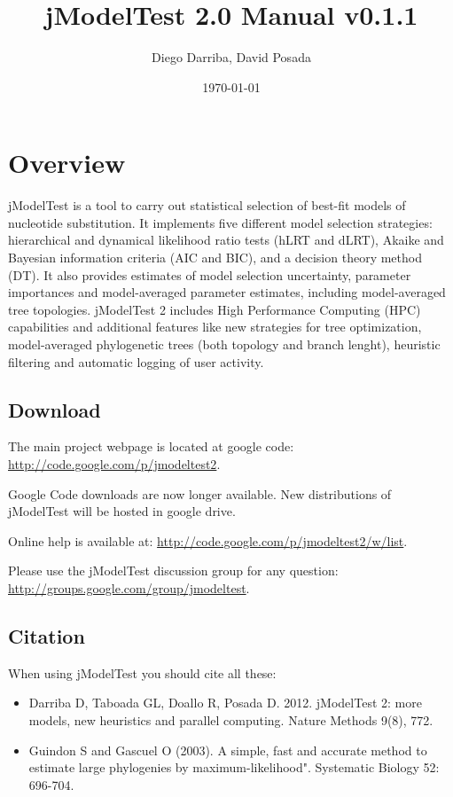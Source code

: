 \documentclass[11pt,twoside,a4paper]{article}
\begin{document}
\providecommand{\versionnumber}{0.1.1}
\title{jModelTest 2.0 Manual v\versionnumber}
\author{Diego Darriba, David Posada}
\date{\today}
\maketitle

\tableofcontents

\section{Overview}

jModelTest is a tool to carry out statistical selection of best-fit models of nucleotide substitution. It implements five different model selection strategies: hierarchical and dynamical likelihood ratio tests (hLRT and dLRT), Akaike and Bayesian information criteria (AIC and BIC), and a decision theory method (DT). It also provides estimates of model selection uncertainty, parameter importances and model-averaged parameter estimates, including model-averaged tree topologies. jModelTest 2 includes High Performance Computing (HPC) capabilities and additional features like new strategies for tree optimization, model-averaged phylogenetic trees (both topology and branch lenght), heuristic filtering and automatic logging of user activity.

\subsection{Download}

The main project webpage is located at google code: \url{http://code.google.com/p/jmodeltest2}.

Google Code downloads are now longer available. New distributions of jModelTest will be hosted in google drive.

Online help is available at: \url{http://code.google.com/p/jmodeltest2/w/list}.

Please use the jModelTest discussion group for any question: \url{http://groups.google.com/group/jmodeltest}.

\subsection{Citation}

When using jModelTest you should cite all these:

\begin{itemize}
\item Darriba D, Taboada GL, Doallo R, Posada D. 2012. jModelTest 2: more models, new heuristics and parallel computing. Nature Methods 9(8), 772.
\item Guindon S and Gascuel O (2003). A simple, fast and accurate method to estimate large phylogenies by maximum-likelihood". Systematic Biology 52: 696-704. 
\end{itemize}
\end{document}
